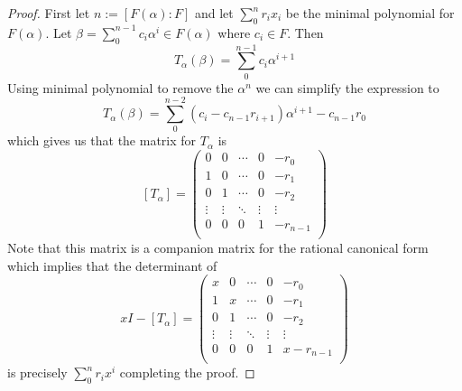 \documentclass[10pt]{article}
\theoremstyle{plain}
\theoremstyle{remark}
\begin{document}
\begin{proof}
  First let $n:=[F(\alpha):F]$ and let $\sum_0^nr_ix_i$ be the minimal polynomial for
  $F(\alpha)$. Let $\beta=\sum_0^{n-1}c_i\alpha^i\in F(\alpha)$ where $c_i\in F$. Then
  \[T_\alpha(\beta)=\sum_0^{n-1}c_i\alpha^{i+1} \]
  Using minimal polynomial to remove the $\alpha^n$ we can simplify the expression to
  \[ T_\alpha(\beta)=\sum_0^{n-2}(c_i-c_{n-1}r_{i+1})\alpha^{i+1}-c_{n-1}r_0 \]
  which gives us that the matrix for $T_\alpha$ is
  \[
    [T_\alpha]=
    \left(
      \begin{array}{ccccc}
        0&0&\cdots&0&-r_0\\
        1&0&\cdots&0&-r_1\\
        0&1&\cdots&0&-r_2\\
        \vdots&\vdots&\ddots&\vdots&\vdots\\
        0&0&0&1&-r_{n-1}\\
      \end{array}
    \right)
  \]
  Note that this matrix is a companion matrix for the
  rational canonical form which implies that the determinant of
  \[
    xI-[T_\alpha] =
    \left(
      \begin{array}{ccccc}
        x&0&\cdots&0&-r_0\\
        1&x&\cdots&0&-r_1\\
        0&1&\cdots&0&-r_2\\
        \vdots&\vdots&\ddots&\vdots&\vdots\\
        0&0&0&1&x-r_{n-1}\\
      \end{array}
    \right)
  \]
  is precisely $\sum_0^{n}r_ix^i$ completing the proof.
  
\end{proof}

\end{document}
